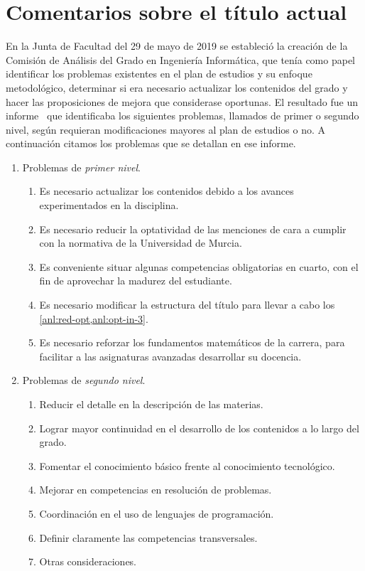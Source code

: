 \chapter{Comentarios sobre el título actual}\label{chap:analysis}


En la Junta de Facultad del 29 de mayo de 2019
se estableció la creación de
la Comisión de Análisis del Grado en Ingeniería Informática,
que tenía como papel
identificar los problemas existentes en
el plan de estudios y su enfoque metodológico,
determinar si era necesario actualizar los contenidos del grado y
hacer las proposiciones de mejora que considerase oportunas.
El resultado fue un informe~\cite{analysis-comission}
que identificaba los siguientes problemas,
llamados de primer o segundo nivel,
según requieran modificaciones mayores al plan de estudios o no.
A continuación citamos los problemas que se detallan en ese informe.

\begin{enumerate}
    \item Problemas de \emph{primer nivel}.
    \begin{enumerate}
        \item Es necesario actualizar los contenidos
        debido a los avances experimentados en la disciplina.
        \item\label{anl:red-opt}
        Es necesario reducir la optatividad de las menciones de cara a
        cumplir con la normativa de la Universidad de Murcia.
        \item\label{anl:opt-in-3}
        Es conveniente situar algunas competencias obligatorias en cuarto,
        con el fin de aprovechar la madurez del estudiante.
        \item Es necesario modificar la estructura del título
        para llevar a cabo los \cref{anl:red-opt,anl:opt-in-3}.
        \item Es necesario reforzar los fundamentos matemáticos de la carrera,
        para facilitar a las asignaturas avanzadas desarrollar su docencia.
    \end{enumerate}

    \item Problemas de \emph{segundo nivel}.
    \begin{enumerate}
        \item Reducir el detalle en la descripción de las materias.
        \item Lograr mayor continuidad en el desarrollo de los contenidos
        a lo largo del grado.
        \item Fomentar el conocimiento básico
        frente al conocimiento tecnológico.
        \item Mejorar en competencias en resolución de problemas.
        \item Coordinación en el uso de lenguajes de programación.
        \item Definir claramente las competencias transversales.
        \item Otras consideraciones.
    \end{enumerate}
\end{enumerate}

